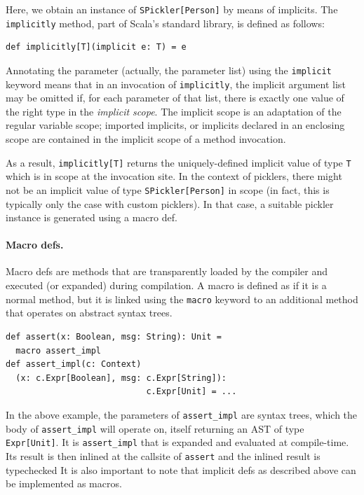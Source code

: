\documentclass[preprint,10pt]{sigplanconf}
\theoremstyle{definition}
\theoremstyle{definition}
\begin{document}
Here, we obtain an instance of \verb|SPickler[Person]| by means of implicits.
The \verb|implicitly| method, part of Scala's standard library, is defined as
follows:

\begin{lstlisting}
def implicitly[T](implicit e: T) = e
\end{lstlisting}
\noindent
Annotating the parameter (actually, the parameter list) using the
\verb|implicit| keyword means that in an invocation of \verb|implicitly|, the
implicit argument list may be omitted if, for each parameter of that list,
there is exactly one value of the right type in the {\em implicit scope}. The
implicit scope is an adaptation of the regular variable scope; imported
implicits, or implicits declared in an enclosing scope are contained in the
implicit scope of a method invocation.

As a result, \verb|implicitly[T]| returns the uniquely-defined implicit value
of type \verb|T| which is in scope at the invocation site. In the context of
picklers, there might not be an implicit value of type \verb|SPickler[Person]|
in scope (in fact, this is typically only the case with custom picklers). In
that case, a suitable pickler instance is generated using a macro def.

\paragraph{Macro defs.} Macro defs are methods that are transparently loaded
by the compiler and executed (or expanded) during compilation. A macro is
defined as if it is a normal method, but it is linked using the \verb|macro|
keyword to an additional method that operates on abstract syntax trees.

\begin{lstlisting}
def assert(x: Boolean, msg: String): Unit =
  macro assert_impl
def assert_impl(c: Context)
  (x: c.Expr[Boolean], msg: c.Expr[String]):
                            c.Expr[Unit] = ...
\end{lstlisting}

In the above example, the parameters of \verb|assert_impl| are syntax trees,
which the body of \verb|assert_impl| will operate on, itself returning an AST
of type \verb|Expr[Unit]|. It is \verb|assert_impl| that is expanded and
evaluated at compile-time. Its result is then inlined at the callsite of
\verb|assert| and the inlined result is typechecked It is also important to
note that implicit defs as described above can be implemented as macros.
\end{document}
